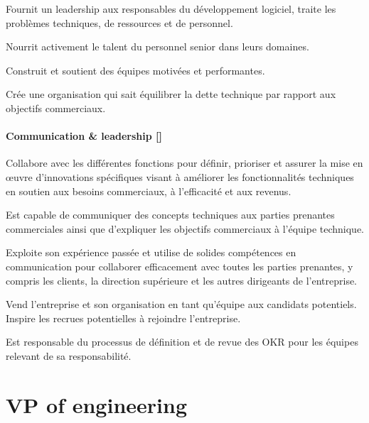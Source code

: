 \documentclass[a4paper, french, openany, 12pt]{book}
\newcommand\cha{\textcolor{RawSienna}{\textbf{Communication \& leadership [\bsc{CHA}]}}}
\begin{document}
\begin{multicols}{2}
  Fournit un leadership aux responsables du développement logiciel, traite les problèmes techniques, de ressources et de 
  personnel.

  Nourrit activement le talent du personnel senior dans leurs domaines.

  Construit et soutient des équipes motivées et performantes.

  Crée une organisation qui sait équilibrer la dette technique par rapport aux objectifs commerciaux.

  \subsubsection*{\cha}

  Collabore avec les différentes fonctions pour définir, prioriser et assurer la mise en œuvre d'innovations spécifiques 
  visant à améliorer les fonctionnalités techniques en soutien aux besoins commerciaux, à l'efficacité et aux revenus.

  Est capable de communiquer des concepts techniques aux parties prenantes commerciales ainsi que d'expliquer les 
  objectifs commerciaux à l'équipe technique.

  Exploite son expérience passée et utilise de solides compétences en communication pour collaborer efficacement avec 
  toutes les parties prenantes, y compris les clients, la direction supérieure et les autres dirigeants de l'entreprise.

  Vend l'entreprise et son organisation en tant qu'équipe aux candidats potentiels. 
  Inspire les recrues potentielles à rejoindre l'entreprise.

  Est responsable du processus de définition et de revue des OKR pour les équipes relevant de sa responsabilité.

\end{multicols}

\chapter{VP of engineering}
\end{document}
